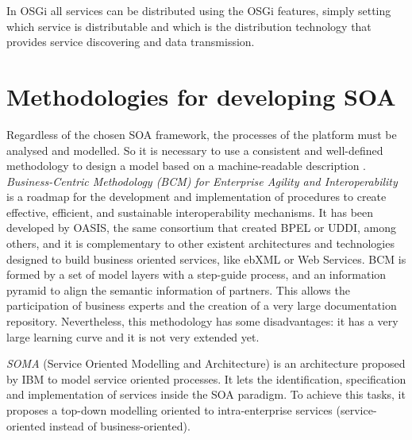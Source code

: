 In OSGi all services can be distributed using the OSGi
features, simply setting which service is distributable and which is
the distribution technology that provides service discovering and data
transmission.   %

\section{Methodologies for developing SOA}
Regardless of the chosen SOA framework, the processes %
 of the platform must be analysed and modelled. So it is necessary to use a consistent and well-defined methodology to design a model based on a machine-readable description \cite{Garcia09UMM}. {\em Business-Centric Methodology (BCM) for Enterprise Agility and Interoperability} \cite{Oasis03BCM} is a roadmap for the development and implementation of procedures to create effective, efficient, and sustainable interoperability mechanisms. It has been developed by OASIS, the same consortium that created BPEL or UDDI, among others, and it is complementary to other existent architectures and technologies designed to build business oriented services, like ebXML or Web Services. BCM is formed by a set of model layers with a step-guide process, and an information pyramid to align the semantic information of partners. This allows the participation of business experts and the creation of a very large documentation repository. Nevertheless, this methodology has some disadvantages: it has a very large learning curve and it is not very extended yet. 

{\em SOMA} (Service Oriented Modelling and Architecture)
\cite{Arsanjani2008SOMA} is an architecture proposed by IBM to model
service oriented processes. It lets the identification, specification
and implementation of services inside the SOA paradigm. To achieve
this tasks, it proposes a top-down modelling oriented to
intra-enterprise services (service-oriented instead of
business-oriented). %

